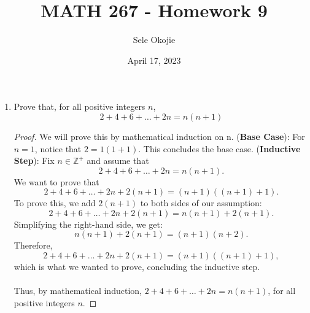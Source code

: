 \documentclass{article}
\title{MATH 267 - Homework 9}
\author{Sele Okojie}
\date{April 17, 2023}
\begin{document}
    \maketitle
    
    \begin{enumerate}

    	\item Prove that, for all positive integers $n$,
    		\[
    			2 + 4 + 6 + \dots + 2n = n(n+1)
    		\]
                \begin{proof}
                    We will prove this by mathematical induction on n.
                    \ppar (\textbf{Base Case}): For $n = 1$, notice that $2 = 1(1 + 1)$. This concludes the base case.
                    \ppar (\textbf{Inductive Step}): Fix $n\in\mathbb{Z}^+$ and assume that 
                        \[
    			             2 + 4 + 6 + \dots + 2n = n(n+1).
    		          \]
                    \ppar We want to prove that
                        \[
    			             2 + 4 + 6 + \dots + 2n + 2(n+1) = (n+1)((n+1) + 1).
    		          \]
                    \ppar To prove this, we add $2(n+1)$ to both sides of our assumption:
                        \[
    			             2 + 4 + 6 + \dots + 2n + 2(n+1) = n(n + 1) + 2(n + 1).
    		          \]
                    \ppar Simplifying the right-hand side, we get:
                        \[
    			             n(n + 1) + 2(n + 1) = (n + 1)(n + 2).
    		          \]
                    \ppar Therefore, 
                    \[
                        2 + 4 + 6 + \dots + 2n + 2(n+1) = (n+1)((n+1) + 1), 
                    \]
                        which is what we wanted to prove, concluding the inductive step.
                    \\\\ Thus, by mathematical induction, $2 + 4 + 6 + \dots + 2n = n(n+1)$, for all positive integers $n$.
                \end{proof}


\end{enumerate}
\end{document}
